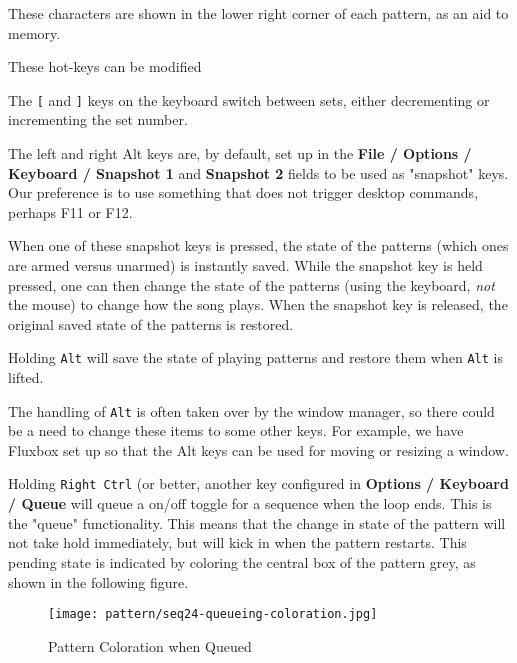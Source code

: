   These characters are shown in the lower right corner of each
   pattern, as an aid to memory.

   These hot-keys can be modified

   \index{keys![}
   The \texttt{[} and
   \index{keys!]}
   \texttt{]} keys on the keyboard
   switch between sets, either decrementing or incrementing the set number.

   The left and right Alt keys are, by default, set up in the
   \textbf{File / Options / Keyboard / Snapshot 1} and
   \textbf{Snapshot 2} fields to be used as "snapshot" keys.
   Our preference is to use something that does not trigger desktop
   commands, perhaps F11 or F12.

   When one of these snapshot keys is pressed, the state of the patterns
   (which ones are armed versus unarmed) is instantly saved.  While the
   snapshot key is held pressed, one can then change the state of the patterns
   (using the keyboard, \textsl{not} the mouse)
   to change how the song plays.  When the snapshot key is released, the
   original saved state of the patterns is restored.

   Holding \texttt{Alt} will save the state of playing patterns and restore
   them when \texttt{Alt} is lifted.

   The handling of \texttt{Alt} is often taken over by the window
   manager, so there could be a need to change these items to some other
   keys.  For example, we have Fluxbox set up so that the Alt keys can
   be used for moving or resizing a window.


	Holding \texttt{Right Ctrl} (or better, another key configured in
   \textbf{Options / Keyboard / Queue} will queue a on/off toggle for a 
	sequence when the loop ends. This is the "queue" functionality.
   This means that the change in state of the pattern will not take hold
   immediately, but will kick in when the pattern restarts.
   This pending state is indicated by coloring the central box of the
   pattern grey, as shown in the following figure.

\begin{figure}[H]
   \centering 
   \texttt{[image: pattern/seq24-queueing-coloration.jpg]}
   \caption{Pattern Coloration when Queued}
   \label{fig:seq64_queueing_coloration}
\end{figure}

